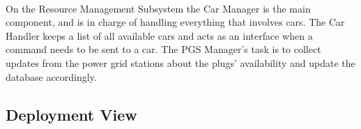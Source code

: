 \documentclass[english]{article}
\begin{document}
\paragraph{}
On the Resource Management Subsystem the Car Manager is the main component, and is in charge of handling everything that involves cars. The Car Handler keeps a list of all available cars and acts as an interface when a command needs to be sent to a car.
The PGS Manager's task is to collect updates from the power grid stations about the plugs' availability and update the database accordingly.

\newpage
\subsection{Deployment View}

\paragraph{}
\end{document}
